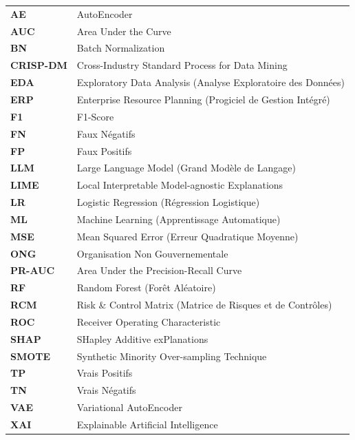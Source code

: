 \documentclass[12pt,a4paper,twoside]{report}
\begin{document}
\begin{tabular}{ll}
  \textbf{AE}       & AutoEncoder \\
  \textbf{AUC}      & Area Under the Curve \\
  \textbf{BN}       & Batch Normalization \\
  \textbf{CRISP-DM} & Cross-Industry Standard Process for Data Mining \\
  \textbf{EDA}      & Exploratory Data Analysis (Analyse Exploratoire des Données) \\
  \textbf{ERP}      & Enterprise Resource Planning (Progiciel de Gestion Intégré) \\
  \textbf{F1}       & F1-Score \\
  \textbf{FN}       & Faux Négatifs \\
  \textbf{FP}       & Faux Positifs \\
  \textbf{LLM}      & Large Language Model (Grand Modèle de Langage) \\
  \textbf{LIME}     & Local Interpretable Model-agnostic Explanations \\
  \textbf{LR}       & Logistic Regression (Régression Logistique) \\
  \textbf{ML}       & Machine Learning (Apprentissage Automatique) \\
  \textbf{MSE}      & Mean Squared Error (Erreur Quadratique Moyenne) \\
  \textbf{ONG}      & Organisation Non Gouvernementale \\
  \textbf{PR-AUC}   & Area Under the Precision-Recall Curve \\
  \textbf{RF}       & Random Forest (Forêt Aléatoire) \\
  \textbf{RCM}      & Risk \& Control Matrix (Matrice de Risques et de Contrôles) \\
  \textbf{ROC}      & Receiver Operating Characteristic \\
  \textbf{SHAP}     & SHapley Additive exPlanations \\
  \textbf{SMOTE}    & Synthetic Minority Over-sampling Technique \\
  \textbf{TP}       & Vrais Positifs \\
  \textbf{TN}       & Vrais Négatifs \\
  \textbf{VAE}      & Variational AutoEncoder \\
  \textbf{XAI}      & Explainable Artificial Intelligence \\
\end{tabular}
\end{document}

